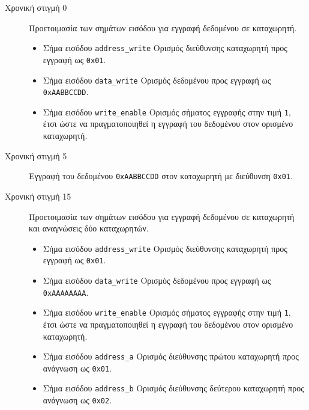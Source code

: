 \documentclass[11pt]{extarticle}
\begin{document}
\begin{description}
\item[Χρονική στιγμή 0] \hfill \newline
Προετοιμασία των σημάτων εισόδου για εγγραφή δεδομένου σε καταχωρητή.
\begin{itemize}
    \item Σήμα εισόδου \texttt{address\_write} \newline Ορισμός διεύθυνσης καταχωρητή προς εγγραφή ως \texttt{0x01}.
    \item Σήμα εισόδου \texttt{data\_write} \newline Ορισμός δεδομένου προς εγγραφή ως \texttt{0xAABBCCDD}.
    \item Σήμα εισόδου \texttt{write\_enable} \newline Ορισμός σήματος εγγραφής στην τιμή \texttt{1}, έτσι ώστε να πραγματοποιηθεί η εγγραφή του δεδομένου στον ορισμένο καταχωρητή.
\end{itemize}
\item[Χρονική στιγμή 5] \hfill \newline
Εγγραφή του δεδομένου \texttt{0xAABBCCDD} στον καταχωρητή με διεύθυνση \texttt{0x01}.
\newpage
\item[Χρονική στιγμή 15] \hfill \newline
Προετοιμασία των σημάτων εισόδου για εγγραφή δεδομένου σε καταχωρητή και αναγνώσεις δύο καταχωρητών.
\begin{itemize}
    \item Σήμα εισόδου \texttt{address\_write} \newline Ορισμός διεύθυνσης καταχωρητή προς εγγραφή ως \texttt{0x01}.
    \item Σήμα εισόδου \texttt{data\_write} \newline Ορισμός δεδομένου προς εγγραφή ως \texttt{0xAAAAAAAA}.
    \item Σήμα εισόδου \texttt{write\_enable} \newline Ορισμός σήματος εγγραφής στην τιμή \texttt{1}, έτσι ώστε να πραγματοποιηθεί η εγγραφή του δεδομένου στον ορισμένο καταχωρητή.
    \item Σήμα εισόδου \texttt{address\_a} \newline Ορισμός διεύθυνσης πρώτου καταχωρητή προς ανάγνωση ως \texttt{0x01}.
    \item Σήμα εισόδου \texttt{address\_b} \newline Ορισμός διεύθυνσης δεύτερου καταχωρητή προς ανάγνωση ως \texttt{0x02}.
\end{itemize}

\end{description}
\end{document}
